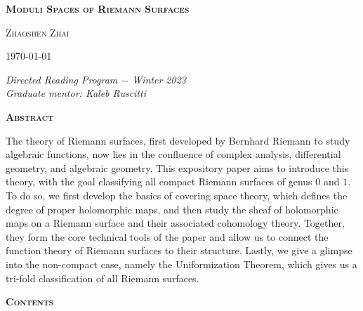 \pagestyle{empty}
\begin{center}
    \Large\textbf{\textsc{Moduli Spaces of Riemann Surfaces}}
    \\[1.2\baselineskip]
    \begin{center}
        \large{\textsc{Zhaoshen Zhai}}
    \end{center}
    \normalsize\today
\end{center}
\vspace*{0.01\textheight}
\hspace{0.2in}\textit{Directed Reading Program $-$ Winter 2023}
\\[0.3\baselineskip]
\hspace*{0.19in}\textit{Graduate mentor: Kaleb Ruscitti}
\\[0.3\baselineskip]
\begin{center}
    \textsc{\bfseries Abstract}
    \\[1.5\baselineskip]
    \begin{minipage}{0.8\textwidth}
        The theory of Riemann surfaces, first developed by Bernhard Riemann to study algebraic functions, now lies in the confluence of complex analysis, differential geometry, and algebraic geometry. This expository paper aims to introduce this theory, with the goal classifying all compact Riemann surfaces of genus $0$ and $1$. To do so, we first develop the basics of covering space theory, which defines the degree of proper holomorphic maps, and then study the sheaf of holomorphic maps on a Riemann surface and their associated cohomology theory. Together, they form the core technical tools of the paper and allow us to connect the function theory of Riemann surfaces to their structure. Lastly, we give a glimpse into the non-compact case, namely the Uniformization Theorem, which gives us a tri-fold classification of all Riemann surfaces.
    \end{minipage}
\end{center}
\vspace*{0.02\textheight}
\begin{center}
    \textsc{\bfseries Contents}
\end{center}

\toccontents
\clearpage
\pagestyle{fancyplain}
\fancyhead[L,C,R]{}
\fancyfoot[L,R]{}
\fancyfoot[C]{\thepage}
\renewcommand{\headrulewidth}{0pt}
\setcounter{page}{1}
